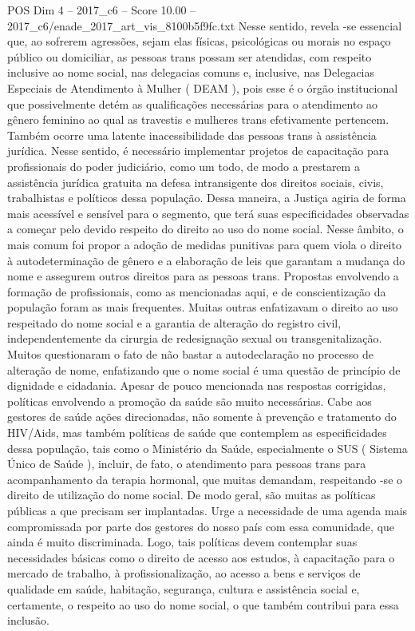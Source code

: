 \begin{textsample}{POS Dim 4 – 2017\_c6 – Score 10.00 – 2017\_c6/enade\_2017\_art\_vis\_8100b5f9fc.txt}
Nesse sentido, revela -se essencial que, ao sofrerem agressões, sejam elas físicas, psicológicas ou morais no espaço público ou domiciliar, as pessoas trans possam ser atendidas, com respeito inclusive ao nome social, nas delegacias comuns e, inclusive, nas Delegacias Especiais de Atendimento à Mulher ( DEAM ), pois esse é o órgão institucional que possivelmente detém as qualificações necessárias para o atendimento ao gênero feminino ao qual as travestis e mulheres trans efetivamente pertencem.
Também ocorre uma latente inacessibilidade das pessoas trans à assistência jurídica.
Nesse sentido, é necessário implementar projetos de capacitação para profissionais do poder judiciário, como um todo, de modo a prestarem a assistência jurídica gratuita na defesa intransigente dos direitos sociais, civis, trabalhistas e políticos dessa população.
Dessa maneira, a Justiça agiria de forma mais acessível e sensível para o segmento, que terá suas especificidades observadas a começar pelo devido respeito do direito ao uso do nome social.
Nesse âmbito, o mais comum foi propor a adoção de medidas punitivas para quem viola o direito à autodeterminação de gênero e a elaboração de leis que garantam a mudança do nome e assegurem outros direitos para as pessoas trans.
Propostas envolvendo a formação de profissionais, como as mencionadas aqui, e de conscientização da população foram as mais frequentes.
Muitas outras enfatizavam o direito ao uso respeitado do nome social e a garantia de alteração do registro civil, independentemente da cirurgia de redesignação sexual ou transgenitalização.
Muitos questionaram o fato de não bastar a autodeclaração no processo de alteração de nome, enfatizando que o nome social é uma questão de princípio de dignidade e cidadania.
Apesar de pouco mencionada nas respostas corrigidas, políticas envolvendo a promoção da saúde são muito necessárias.
Cabe aos gestores de saúde ações direcionadas, não somente à prevenção e tratamento do HIV/Aids, mas também políticas de saúde que contemplem as especificidades dessa população, tais como o Ministério da Saúde, especialmente o SUS ( Sistema Único de Saúde ), incluir, de fato, o atendimento para pessoas trans para acompanhamento da terapia hormonal, que muitas demandam, respeitando -se o direito de utilização do nome social.
De modo geral, são muitas as políticas públicas a que precisam ser implantadas.
Urge a necessidade de uma agenda mais compromissada por parte dos gestores do nosso país com essa comunidade, que ainda é muito discriminada.
Logo, tais políticas devem contemplar suas necessidades básicas como o direito de acesso aos estudos, à capacitação para o mercado de trabalho, à profissionalização, ao acesso a bens e serviços de qualidade em saúde, habitação, segurança, cultura e assistência social e, certamente, o respeito ao uso do nome social, o que também contribui para essa inclusão.

\end{textsample}
